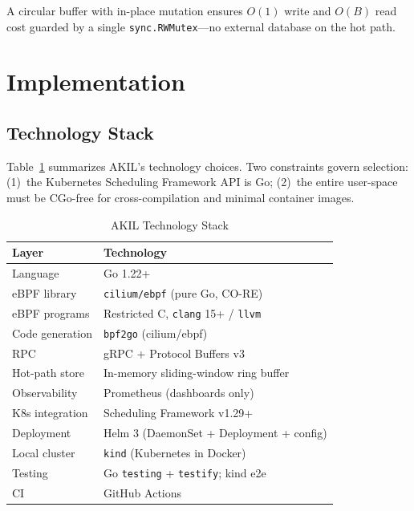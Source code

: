 \documentclass[10pt,conference,a4paper]{IEEEtran}
\begin{document}
A circular buffer with in-place mutation ensures $O(1)$ write and $O(B)$ read cost
guarded by a single \texttt{sync.RWMutex}---no external database on the hot path.

\section{Implementation}
\label{sec:implementation}

\subsection{Technology Stack}

Table~\ref{tab:stack} summarizes AKIL's technology choices. Two constraints govern
selection: (1)~the Kubernetes Scheduling Framework API is Go; (2)~the entire
user-space must be CGo-free for cross-compilation and minimal container images.

\begin{table}[htbp]
\centering
\caption{AKIL Technology Stack}
\label{tab:stack}
\renewcommand{\arraystretch}{1.12}
\begin{tabular}{ll}
\toprule
\textbf{Layer} & \textbf{Technology} \\
\midrule
Language         & Go 1.22+ \\
eBPF library     & \texttt{cilium/ebpf} (pure Go, CO-RE) \\
eBPF programs    & Restricted C, \texttt{clang} 15+ / \texttt{llvm} \\
Code generation  & \texttt{bpf2go} (cilium/ebpf) \\
RPC              & gRPC + Protocol Buffers v3 \\
Hot-path store   & In-memory sliding-window ring buffer \\
Observability    & Prometheus (dashboards only) \\
K8s integration  & Scheduling Framework v1.29+ \\
Deployment       & Helm 3 (DaemonSet + Deployment + config) \\
Local cluster    & \texttt{kind} (Kubernetes in Docker) \\
Testing          & Go \texttt{testing} + \texttt{testify}; kind e2e \\
CI               & GitHub Actions \\
\bottomrule
\end{tabular}
\end{table}
\end{document}

